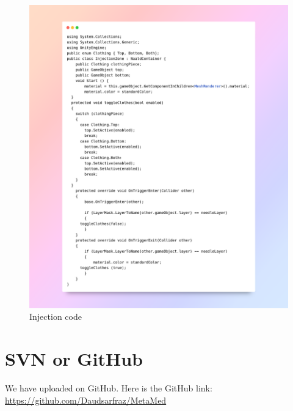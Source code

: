 \begin{figure}[ht]
	\centering
	\includegraphics[width=1\linewidth, height=1.1\linewidth]{Images/Injection.png}
	\caption{Injection code}
\end{figure}

\section{SVN or GitHub}
We have uploaded on GitHub. Here is the GitHub link: \\
\href{https://github.com/Daudsarfraz/MetaMed}{https://github.com/Daudsarfraz/MetaMed}